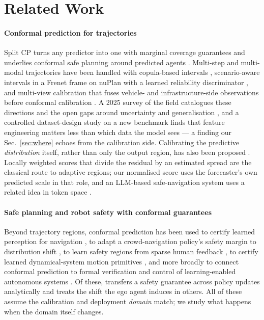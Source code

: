 \section{Related Work}
\paragraph{Conformal prediction for trajectories}
Split CP turns any predictor into one with marginal coverage guarantees \cite{vovk2005algorithmic,angelopoulos2023gentle}
and underlies conformal safe planning around predicted agents \cite{lindemann2023safe}. Multi-step and multi-modal
trajectories have been handled with copula-based intervals \cite{sun2024copula}, scenario-aware intervals in a Frenet
frame on nuPlan with a learned reliability discriminator \cite{shu2025scenario}, and multi-view calibration that
fuses vehicle- and infrastructure-side
observations before conformal calibration \cite{chen2024v2i}. A 2025 survey of the field catalogues these directions
and the open gaps around uncertainty and generalisation \cite{abdelmadjid2025survey}, and a controlled dataset-design study on a new benchmark finds that feature
engineering matters less than which data the model sees \cite{demmler2025dataset} --- a finding our Sec.~\ref{sec:where}
echoes from the calibration side. Calibrating the predictive \emph{distribution} itself, rather than only the
output region, has also been proposed \cite{pouria2026gaussian}. Locally weighted scores that divide the residual by
an estimated spread \cite{lei2018distribution} are the classical route to adaptive regions; our normalised score uses
the forecaster's own predicted scale in that role, and an LLM-based safe-navigation system uses a related idea in token
space \cite{doula2025safepath}.

\paragraph{Safe planning and robot safety with conformal guarantees}
Beyond trajectory regions, conformal prediction has been used to certify learned perception for navigation
\cite{mei2024perceive}, to adapt a crowd-navigation policy's safety margin to distribution shift
\cite{yao2025crowdnav}, to learn safety regions from sparse human feedback \cite{feldman2025robotsafety}, to certify
learned dynamical-system motion primitives \cite{binny2026stable}, and more broadly to connect conformal prediction
to formal verification and control of learning-enabled autonomous systems \cite{lindemann2024formal}. Of these, \cite{mirzaeedodangeh2025interactive} transfers a safety guarantee across policy updates analytically and
\cite{binny2025moved} treats the shift the ego agent induces in others. All of these assume the calibration and deployment \emph{domain}
match; we study what happens when the domain itself changes.

